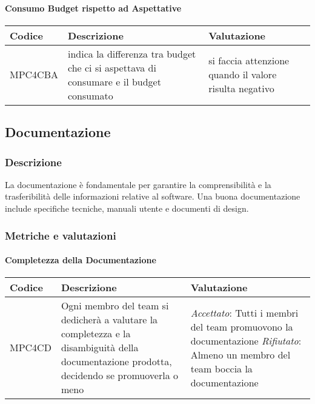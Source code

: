 \newpage

\paragraph{Consumo Budget rispetto ad Aspettative}

\begin{table}[h]
\centering
\begin{tabular}{ |>{\centering\arraybackslash}m{3cm}|>{\centering\arraybackslash}m{10cm}|>{\centering\arraybackslash}m{3cm}| }
\hline
Codice & Descrizione & Valutazione\\
\hline
MPC4CBA& indica la differenza tra budget che ci si aspettava di consumare e il budget consumato  & si faccia attenzione quando il valore risulta negativo\\
\hline
\end{tabular}
\end{table}

\subsection{Documentazione}
\subsubsection{Descrizione}
La documentazione è fondamentale per garantire la comprensibilità e la trasferibilità delle informazioni relative al software. Una buona documentazione include specifiche tecniche, manuali utente e documenti di design.

\subsubsection{Metriche e valutazioni}
\paragraph{Completezza della Documentazione}

\begin{table}[h]
\centering
\begin{tabular}{ |>{\centering\arraybackslash}m{3cm}|>{\centering\arraybackslash}m{10cm}|>{\centering\arraybackslash}m{3cm}| }
\hline
Codice & Descrizione & Valutazione\\
\hline
MPC4CD & Ogni membro del team si dedicherà a valutare la completezza e la disambiguità della documentazione prodotta, decidendo se promuoverla o meno &
\textit{Accettato}: Tutti i membri del team promuovono la documentazione
\textit{Rifiutato}: Almeno un membro del team boccia la documentazione \\
\hline
\end{tabular}
\end{table}

